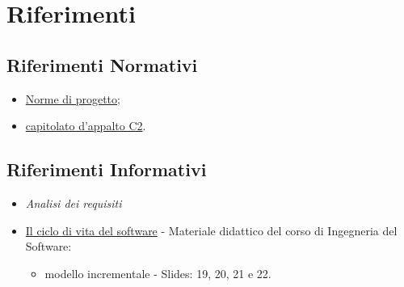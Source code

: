 \section{Riferimenti}
\subsection{Riferimenti Normativi}
\begin{itemize}
    \item \href{https://github.com/SWEasabi/norme-di-progetto/releases}{Norme di progetto};
    \item \href{https://www.math.unipd.it/~tullio/IS-1/2022/Progetto/C2.pdf}{capitolato d'appalto C2}.
\end{itemize}

\subsection{Riferimenti Informativi}
\begin{itemize}
    \item \textit{Analisi dei requisiti}
    \item \href{https://www.math.unipd.it/~tullio/IS-1/2022/Dispense/T03.pdf}{Il ciclo di vita del software} - Materiale didattico del corso di Ingegneria del Software:
    \begin{itemize}
        \item modello incrementale - Slides: 19, 20, 21 e 22.
    \end{itemize}
\end{itemize}
